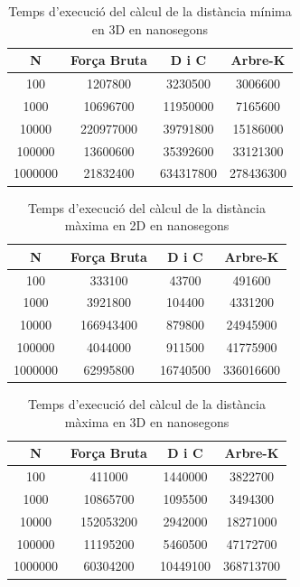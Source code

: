 \documentclass{ieeetj}
\begin{document}
\begin{table}[H]
    \centering
    \begin{tabular}{|c|c|c|c| }
        \hline
        \textbf{N} & \textbf{Força Bruta} & \textbf{D i C} & \textbf{Arbre-K}  \\
        \hline
         100    & 1207800&	3230500	&3006600 \\
         1000  & 10696700&	11950000	&7165600     \\
         10000  &  220977000	&39791800	&15186000 \\
         100000  & 13600600&	35392600&	33121300  \\
         1000000  & 21832400&	634317800	&278436300 \\
      
        \hline
    \end{tabular}
    \vspace{3mm}
    \caption{Temps d'execució del càlcul de la distància mínima en 3D en nanosegons}
    \label{tab:complexitat}
\end{table}

\begin{table}[H]
    \centering
    \begin{tabular}{|c|c|c|c| }
        \hline
        \textbf{N} & \textbf{Força Bruta} & \textbf{D i C} & \textbf{Arbre-K}  \\
        \hline
         100    & 333100	&43700	&491600 \\
         1000  &  3921800 &	104400	&4331200    \\
         10000  & 166943400&	879800&	24945900  \\
         100000  & 4044000	&911500	&41775900  \\
         1000000  & 62995800&	16740500&	336016600 \\
      
        \hline
    \end{tabular}
    \vspace{3mm}
    \caption{Temps d'execució del càlcul de la distància màxima en 2D en nanosegons}
    \label{tab:complexitat}
\end{table}

 \begin{table}[H]
    \centering
    \begin{tabular}{|c|c|c|c| }
        \hline
        \textbf{N} & \textbf{Força Bruta} & \textbf{D i C} & \textbf{Arbre-K}  \\
        \hline
         100    &411000&	1440000	& 3822700 \\
         1000  &  10865700 &	1095500&	3494300    \\
         10000  &   152053200 &	2942000	&18271000 \\
         100000  & 11195200&	5460500	&47172700  \\
         1000000  & 60304200 &	10449100&	368713700 \\
      
        \hline
    \end{tabular}
    \vspace{3mm}
    \caption{Temps d'execució del càlcul de la distància màxima en 3D en nanosegons}
    \label{tab:complexitat}
\end{table}
\end{document}
